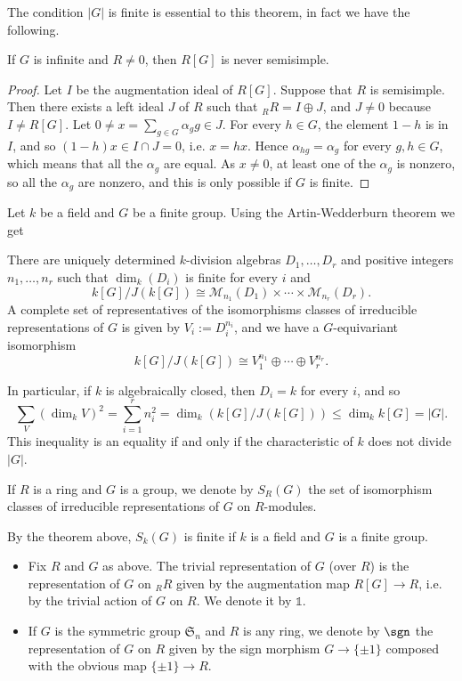 The condition $|G|$ is finite is essential to this theorem, in fact we have the following.
\begin{proposition}
If $G$ is infinite and $R\neq0$, then $R[G]$ is never semisimple.
\end{proposition}
\begin{proof}
Let $I$ be the augmentation ideal of $R[G]$. Suppose that $R$ is semisimple. Then there exists a left ideal $J$ of $R$ such that $_{R}R=I\oplus J$, and $J\neq 0$ because $I\neq R[G]$. Let $0\neq x=\sum_{g\in G}\alpha_gg\in J$. For every $h\in G$, the element $1-h$ is in $I$, and so $(1-h)x\in I\cap J=0$, i.e. $x=hx$. Hence $\alpha_{hg}=\alpha_g$ for every $g,h\in G$, which means that all the $\alpha_g$ are equal. As $x\neq 0$, at least one of the $\alpha_g$ is nonzero, so all the $\alpha_g$ are nonzero, and this is only possible if $G$ is finite.
\end{proof}
Let $k$ be a field and $G$ be a finite group. Using the Artin-Wedderburn theorem we get
\begin{theorem}
There are uniquely determined $k$-division algebras $D_1,\dots,D_r$ and positive integers $n_1,\dots,n_r$ such that $\dim_k(D_i)$ is finite for every $i$ and
\[k[G]/J(k[G])\cong\mathcal{M}_{n_1}(D_1)\times\cdots\times\mathcal{M}_{n_r}(D_r).\]
A complete set of representatives of the isomorphisms classes of irreducible representations of $G$ is given by $V_i:=D_i^{n_i}$, and we have a $G$-equivariant isomorphism
\[k[G]/J(k[G])\cong V_1^{n_1}\oplus\cdots\oplus V_r^{n_r}.\]

In particular, if $k$ is algebraically closed, then $D_i=k$ for every $i$, and so
\[\sum_V(\dim_k V)^2=\sum_{i=1}^{r}n_i^2=\dim_k(k[G]/J(k[G]))\leq\dim_kk[G]=|G|.\]
This inequality is an equality if and only if the characteristic of $k$ does not divide $|G|$.
\end{theorem}
\begin{definition}
If $R$ is a ring and $G$ is a group, we denote by $S_R(G)$ the set of isomorphism classes of irreducible representations of $G$ on $R$-modules.
\end{definition}
By the theorem above, $S_k(G)$ is finite if $k$ is a field and $G$ is a finite group.
\begin{example}
\mbox{}
\begin{itemize}
\item Fix $R$ and $G$ as above. The trivial representation of $G$ (over $R$) is the representation of $G$ on $_{R}R$ given by the augmentation map $R[G]\to R$, i.e. by the trivial action of $G$ on $R$. We denote it by $\mathds{1}$.
\item If $G$ is the symmetric group $\mathfrak{S}_n$ and $R$ is any ring, we denote by $\sgn$ the representation of $G$ on $R$ given by the sign morphism $G\to\{\pm1\}$ composed with the obvious map $\{\pm1\}\to R$.
\end{itemize}
\end{example}
